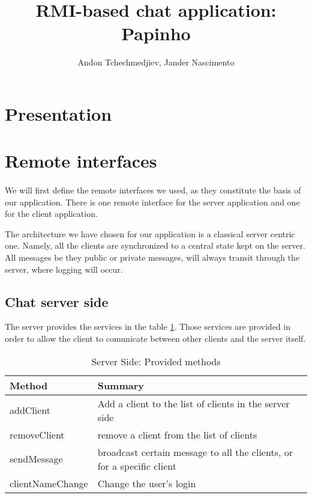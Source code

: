 \documentclass[times, 8pt,twocolumn]{article}
\title {RMI-based chat application: Papinho}
\author{Andon Tchechmedjiev, Jander Nascimento}
\begin{document}
\maketitle
\section{Presentation}
\section{Remote interfaces}

\paragraph{} We will first define the remote interfaces we used, as they constitute the basis of our application. There is one remote interface for the server application and one for the client application.

The architecture we have chosen for our application is a classical server centric one. Namely, all the clients are synchronized to a central state kept on the server. All messages be they public or private messages, will always transit through the server, where logging will occur.

\subsection{Chat server side}

The server provides the services in the table \ref{tab:serverprovide}. Those services are provided in order to allow the client to comunicate between other clients and the server itself. 

  \begin{table}[H]
  \begin{center}
      \begin{tabular}{ | l | p{5cm} |}
      \hline
      Method & Summary \\ \hline
      addClient & Add a client to the list of clients in the server side \\ \hline 
      removeClient & remove a client from the list of clients \\ \hline
      sendMessage &  broadcast certain message to all the clients, or for a specific client\\ \hline
      clientNameChange & Change the user's login \\ \hline
      \end{tabular}
  \end{center}
  \caption{Server Side: Provided methods}
  \label{tab:serverprovide}
  \end{table}
\end{document}
